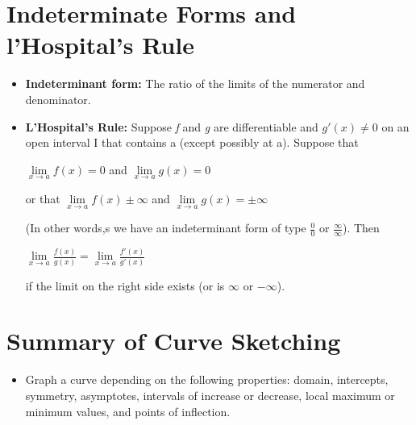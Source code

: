 \documentclass{report}
\begin{document}
		\section{Indeterminate Forms and l'Hospital's Rule}
			\begin{itemize}\addtolength{\leftskip}{2em}
				\item \textbf{Indeterminant form:} The ratio of the limits of the numerator and denominator.
				\item \textbf{L'Hospital's Rule:} Suppose \textit{f} and \textit{g} are differentiable and $g'(x)\ne 0$ on an open interval I that contains a (except possibly at a). Suppose that
				\begin{center}
				$\lim\limits_{x\rightarrow a}f(x)=0$ and $\lim\limits_{x\rightarrow a}g(x)=0$
				\end{center}
				\begin{center}
				or that $\lim\limits_{x\rightarrow a}f(x)\pm \infty$ and $\lim\limits_{x\rightarrow a}g(x)=\pm \infty$
				\end{center}
				(In other words,s we have an indeterminant form of type $\frac{0}{0}$ or $\frac{\infty}{\infty}$). Then
				\begin{center}
				$\lim\limits_{x \rightarrow a}\frac{f(x)}{g(x)}=\lim\limits_{x \rightarrow a}\frac{f'(x)}{g'(x)}$
				\end{center}
				if the limit on the right side exists (or is $\infty$ or $-\infty$).
			\end{itemize}
		\section{Summary of Curve Sketching}
			\begin{itemize}\addtolength{\leftskip}{2em}
				\item Graph a curve depending on the following properties: domain, intercepts, symmetry, asymptotes, intervals of increase or decrease, local maximum or minimum values, and points of inflection. 
			\end{itemize}
			\setcounter{section}{+6}
\end{document}

